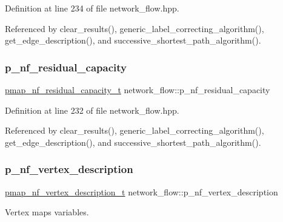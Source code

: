 Definition at line 234 of file network\+\_\+flow.\+hpp.



Referenced by clear\+\_\+results(), generic\+\_\+label\+\_\+correcting\+\_\+algorithm(), get\+\_\+edge\+\_\+description(), and successive\+\_\+shortest\+\_\+path\+\_\+algorithm().

\mbox{\label{classnetwork__flow_a2fa45449cc9a0a87edff12fbdae718c6}} 
\subsubsection{\texorpdfstring{p\+\_\+nf\+\_\+residual\+\_\+capacity}{p\_nf\_residual\_capacity}}
{\footnotesize\ttfamily \hyperlink{classnetwork__flow_a853061022784c1835c390a91e1691839}{pmap\+\_\+nf\+\_\+residual\+\_\+capacity\+\_\+t} network\+\_\+flow\+::p\+\_\+nf\+\_\+residual\+\_\+capacity}



Definition at line 232 of file network\+\_\+flow.\+hpp.



Referenced by clear\+\_\+results(), generic\+\_\+label\+\_\+correcting\+\_\+algorithm(), get\+\_\+edge\+\_\+description(), and successive\+\_\+shortest\+\_\+path\+\_\+algorithm().

\mbox{\label{classnetwork__flow_a9c07823ba97add0bb2d94897bc4cb12d}} 
\subsubsection{\texorpdfstring{p\+\_\+nf\+\_\+vertex\+\_\+description}{p\_nf\_vertex\_description}}
{\footnotesize\ttfamily \hyperlink{classnetwork__flow_a74ecf4431065049cd8c880b82b2b1a2c}{pmap\+\_\+nf\+\_\+vertex\+\_\+description\+\_\+t} network\+\_\+flow\+::p\+\_\+nf\+\_\+vertex\+\_\+description}



Vertex maps variables. 




